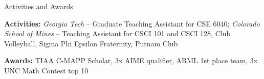 \documentclass{resume} %
\begin{document}
\begin{rSection}{Activities and Awards} 

\textbf{Activities:} \textit{Georgia Tech} -- Graduate Teaching Assistant for CSE 6040; \textit{Colorado School of Mines} -- Teaching Assistant for CSCI 101 and CSCI 128, Club Volleyball, Sigma Phi Epsilon Fraternity, Putnam Club
\vspace{-4pt}

\textbf{Awards:} TIAA C-MAPP Scholar, 3x AIME qualifier, ARML 1st place team, 3x UNC Math Contest top 10
\vspace{-4pt}


\vspace{-4pt}

\end{rSection}
\end{document}
